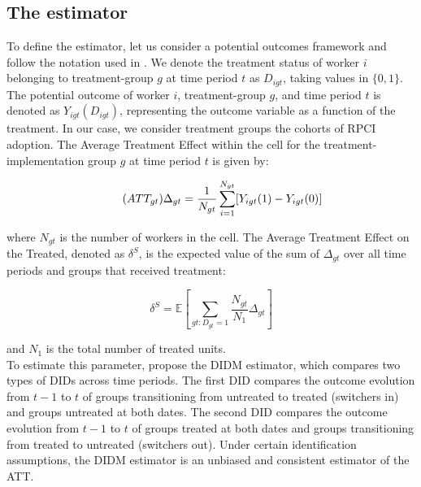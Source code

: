 \documentclass[oneside,11pt]{article}
\begin{document}
\subsection{The estimator}

To define the estimator, let us consider a potential outcomes framework and follow the notation used in \cite{de2020two}. We denote the treatment status of worker $i$ belonging to treatment-group $g$ at time period $t$ as $D_{igt}$, taking values in $\{0,1\}$. The potential outcome of worker $i$, treatment-group $g$, and time period $t$ is denoted as $Y_{igt}(D_{igt})$, representing the outcome variable as a function of the treatment. In our case, we consider treatment groups the cohorts of RPCI adoption. The Average Treatment Effect within the cell for the treatment-implementation group $g$ at time period $t$ is given by:

\begin{equation}
    \tag{$ATT_{gt}$}
    \Delta_{gt} = \frac{1}{N_{gt}} \sum_{i=1}^{N_{gt}} [Y_{igt}(1) - Y_{igt}(0)]
\end{equation}

\noindent where $N_{gt}$ is the number of workers in the cell. The Average Treatment Effect on the Treated, denoted as $\delta^{S}$, is the expected value of the sum of $\Delta_{gt}$ over all time periods and groups that received treatment:

\begin{equation}
    \tag{$ATT$}
    \delta^{S} = \mathbb{E}\left[\sum_{gt:D_{gt}=1} \frac{N_{gt}}{N_1} \Delta_{gt}\right]
\end{equation}

\noindent and $N_1$ is the total number of treated units. \\

To estimate this parameter, \cite{de2020two} propose the DIDM estimator, which compares two types of DIDs across time periods. The first DID compares the outcome evolution from $t-1$ to $t$ of groups transitioning from untreated to treated (switchers in) and groups untreated at both dates. The second DID compares the outcome evolution from $t-1$ to $t$ of groups treated at both dates and groups transitioning from treated to untreated (switchers out). Under certain identification assumptions, the DIDM estimator is an unbiased and consistent estimator of the ATT. \\

\end{document}
